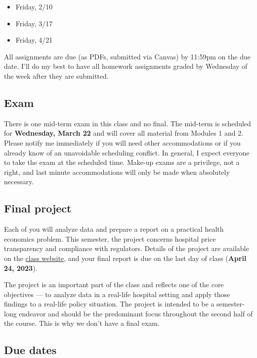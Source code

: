 \documentclass[11pt,]{article}
\providecommand{\tightlist}{%
  \setlength{\itemsep}{0pt}\setlength{\parskip}{0pt}}
\begin{document}
\begin{itemize}
\tightlist
\item
  Friday, 2/10
\item
  Friday, 3/17
\item
  Friday, 4/21
\end{itemize}

All assignments are due (as PDFs, submitted via Canvas) by 11:59pm on
the due date. I'll do my best to have all homework assignments graded by
Wednesday of the week after they are submitted.

\hypertarget{exam}{%
\subsection{Exam}\label{exam}}

There is one mid-term exam in this class and no final. The mid-term is
scheduled for \textbf{Wednesday, March 22} and will cover all material
from Modules 1 and 2. Please notify me immediately if you will need
other accommodations or if you already know of an unavoidable scheduling
conflict. In general, I expect everyone to take the exam at the
scheduled time. Make-up exams are a privilege, not a right, and last
minute accommodations will only be made when absolutely necessary.

\hypertarget{final-project}{%
\subsection{Final project}\label{final-project}}

Each of you will analyze data and prepare a report on a practical health
economics problem. This semester, the project concerns hospital price
transparency and compliance with regulators. Details of the project are
available on the
\href{https://econ372s23.classes.ianmccarthyecon.com/}{class website},
and your final report is due on the last day of class (\textbf{April 24,
2023}).

The project is an important part of the class and reflects one of the
core objectives --- to analyze data in a real-life hospital setting and
apply those findings to a real-life policy situation. The project is
intended to be a semester-long endeavor and should be the predominant
focus throughout the second half of the course. This is why we don't
have a final exam.

\hypertarget{due-dates}{%
\subsection{Due dates}\label{due-dates}}
\end{document}
